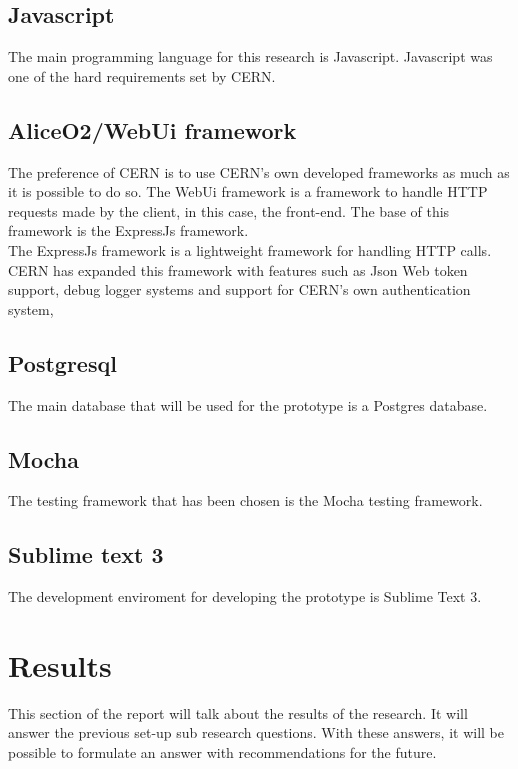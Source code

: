 \documentclass[paper=a4, fontsize=11pt,twoside]{scrartcl}	%
\begin{document}
\subsection{Javascript}
The main programming language for this research is Javascript. Javascript was one of the hard requirements set by CERN.

\subsection{AliceO2/WebUi framework}
The preference of CERN is to use CERN's own developed frameworks as much as it is possible to do so. The WebUi framework is a framework to handle HTTP requests made by the client, in this case, the front-end. The base of this framework is the ExpressJs framework. \\
The ExpressJs framework is a lightweight framework for handling HTTP calls. CERN has expanded this framework with features such as Json Web token support, debug logger systems and support for CERN's own authentication system,

\subsection{Postgresql}
The main database that will be used for the prototype is a Postgres database. 

\subsection{Mocha}
The testing framework that has been chosen is the Mocha testing framework.

\subsection{Sublime text 3}
The development enviroment for developing the prototype is Sublime Text 3.



\newpage
\section{Results}
This section of the report will talk about the results of the research. It will answer the previous set-up sub research questions. With these answers, it will be possible to formulate an answer with recommendations for the future.
\end{document}
